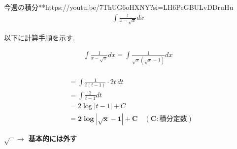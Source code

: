 \documentclass[main]{subfiles}
\begin{document}

\begin{mondai}{12}{今週の積分}{**}{https://youtu.be/7ThUG6oHXNY?si=LH6PeGBULvDDruHu}
    \begin{align*}
        \int \frac{1}{x - \sqrt{x}} dx
    \end{align*}
\end{mondai}


\solutionhead
\hfill
以下に計算手順を示す.
\hfill\

\begin{align*}
\int \frac{1}{x - \sqrt{x}} dx = \int \frac{1}{\sqrt{x}(\sqrt{x}-1)} dx \\
\end{align*}


\begin{align*}
&= \int \frac{1}{t(t-1)} \cdot 2t \, dt \\
&= \int \frac{2}{t-1} dt \\
&= 2\log|t-1| + C \\
&= \boldsymbol{2\log|\sqrt{x}-1| + C \quad (C:\textbf{積分定数})}
\end{align*}

\begin{focusbox}
\centering
\textbf{$\sqrt{\phantom{x}}\rightarrow$  基本的には外す}
\end{focusbox}
\end{document}
